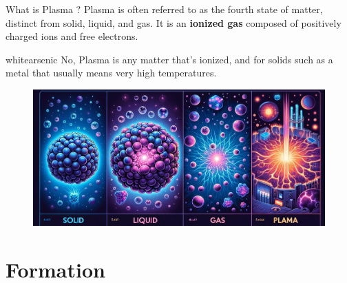 \documentclass[13pt]{beamer}
\begin{document}
	\begin{frame}[t]{What is Plasma ?}
       Plasma is often referred to as the fourth state of matter, distinct from solid, liquid, and gas. It is an \textbf{ionized gas} composed of positively charged ions and free electrons.

			\begin{bee}{white}{arsenic}
				No, Plasma is any matter that’s ionized, and for solids such as a metal that usually means very high temperatures.
			\end{bee}

		\begin{figure}

			\href{https://www.collegenp.com/uploads/2023/10/Plasma-The-Fourth-State-of-Matter-Explained.jpg}{
				\includegraphics[height =0.16\textwidth]{Images/state of matter.jpg}
			}
		\end{figure}



	\end{frame}


	\section{Formation}
\end{document}

